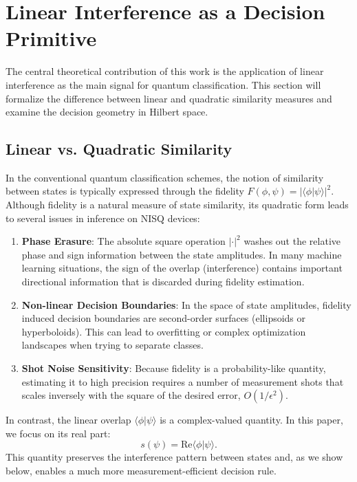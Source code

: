 \documentclass[conference]{IEEEtran}
\begin{document}
\section{Linear Interference as a Decision Primitive}

The central theoretical contribution of this work is the application of linear interference as the main signal for quantum classification. This section will formalize the difference between linear and quadratic similarity measures and examine the decision geometry in Hilbert space.

\subsection{Linear vs. Quadratic Similarity}

In the conventional quantum classification schemes, the notion of similarity between states is typically expressed through the fidelity $F(\phi, \psi) = |\langle \phi | \psi \rangle|^2$. Although fidelity is a natural measure of state similarity, its quadratic form leads to several issues in inference on NISQ devices:
\begin{enumerate}
    \item \textbf{Phase Erasure}: The absolute square operation $|\cdot|^2$ washes out the relative phase and sign information between the state amplitudes. In many machine learning situations, the sign of the overlap (interference) contains important directional information that is discarded during fidelity estimation.
    \item \textbf{Non-linear Decision Boundaries}: In the space of state amplitudes, fidelity induced decision boundaries are second-order surfaces (ellipsoids or hyperboloids). This can lead to overfitting or complex optimization landscapes when trying to separate classes.
    \item \textbf{Shot Noise Sensitivity}: Because fidelity is a probability-like quantity, estimating it to high precision requires a number of measurement shots that scales inversely with the square of the desired error, $O(1/\epsilon^2)$.
\end{enumerate}

In contrast, the linear overlap $\langle \phi | \psi \rangle$ is a complex-valued quantity. In this paper, we focus on its real part:
\begin{equation}
s(\psi) = \mathrm{Re}\langle \phi | \psi \rangle.
\end{equation}
This quantity preserves the interference pattern between states and, as we show below, enables a much more measurement-efficient decision rule.
\end{document}
